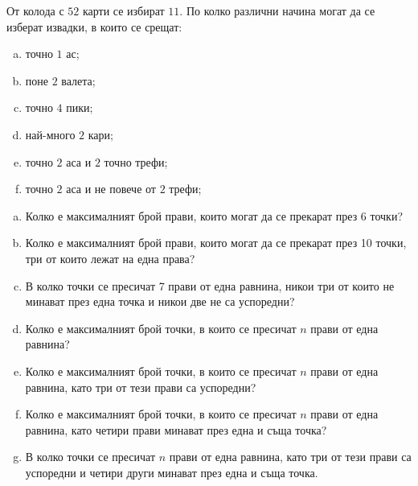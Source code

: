 \begin{problem}
  От колода с $52$ карти се избират $11$. По колко различни начина могат да се изберат извадки, в които се срещат:
  \begin{enumerate}[a)]
  \item
    точно $1$ ас;
  \item
    поне $2$ валета;
  \item
    точно $4$ пики;
  \item
    най-много $2$ кари;
  \item
    точно $2$ аса и $2$ точно трефи;
  \item
    точно $2$ аса и не повече от $2$ трефи;
  \end{enumerate}
\end{problem}

\begin{problem}
  \begin{enumerate}[a)]
  \item
    Колко е максималният брой прави, които могат да се прекарат през 6 точки?
  \item
    Колко е максималният брой прави, които могат да се прекарат през 10 точки, три от които лежат на една права? 
  \item
    В колко точки се пресичат 7 прави от една равнина, никои три от които не минават през една точка и никои две не са успоредни?
  \item
    Колко е максималният брой точки, в които се пресичат $n$ прави от една равнина?
  \item
    Колко е максималният брой точки, в които се пресичат $n$ прави от една равнина, като три от тези прави са успоредни?
  \item
    Колко е максималният брой точки, в които се пресичат $n$ прави от една равнина, като четири прави минават през една и съща точка?
  \item
    В колко точки се пресичат $n$ прави от една равнина, като три от тези прави са успоредни и четири други минават през една и съща точка.
\end{enumerate}
\end{problem}





